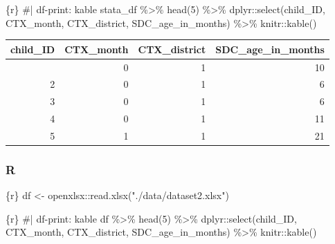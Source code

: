 \documentclass[
  letterpaper,
  DIV=11,
  numbers=noendperiod,
  oneside]{scrreprt}
\newenvironment{Shaded}{\begin{snugshade}}{\end{snugshade}}
\newcommand{\CommentTok}[1]{\textcolor[rgb]{0.37,0.37,0.37}{#1}}
\newcommand{\DecValTok}[1]{\textcolor[rgb]{0.68,0.00,0.00}{#1}}
\newcommand{\FunctionTok}[1]{\textcolor[rgb]{0.28,0.35,0.67}{#1}}
\newcommand{\InformationTok}[1]{\textcolor[rgb]{0.37,0.37,0.37}{#1}}
\newcommand{\NormalTok}[1]{\textcolor[rgb]{0.00,0.23,0.31}{#1}}
\newcommand{\OtherTok}[1]{\textcolor[rgb]{0.00,0.23,0.31}{#1}}
\newcommand{\SpecialCharTok}[1]{\textcolor[rgb]{0.37,0.37,0.37}{#1}}
\newcommand{\StringTok}[1]{\textcolor[rgb]{0.13,0.47,0.30}{#1}}
\begin{document}
\begin{Shaded}
\begin{Highlighting}[]
\InformationTok{\textasciigrave{}\textasciigrave{}\textasciigrave{}\{r\}}
\CommentTok{\#| df{-}print: kable}
\NormalTok{stata\_df }\SpecialCharTok{\%\textgreater{}\%}
  \FunctionTok{head}\NormalTok{(}\DecValTok{5}\NormalTok{) }\SpecialCharTok{\%\textgreater{}\%}
\NormalTok{  dplyr}\SpecialCharTok{::}\FunctionTok{select}\NormalTok{(child\_ID,}
\NormalTok{                CTX\_month,}
\NormalTok{                CTX\_district,}
\NormalTok{                SDC\_age\_in\_months) }\SpecialCharTok{\%\textgreater{}\%}
\NormalTok{  knitr}\SpecialCharTok{::}\FunctionTok{kable}\NormalTok{()}
\InformationTok{\textasciigrave{}\textasciigrave{}\textasciigrave{}}
\end{Highlighting}
\end{Shaded}

\begin{longtable}[]{@{}rrrr@{}}
\toprule\noalign{}
child\_ID & CTX\_month & CTX\_district & SDC\_age\_in\_months \\
\midrule\noalign{}
\endhead
\bottomrule\noalign{}
\endlastfoot
1 & 0 & 1 & 10 \\
2 & 0 & 1 & 6 \\
3 & 0 & 1 & 6 \\
4 & 0 & 1 & 11 \\
5 & 1 & 1 & 21 \\
\end{longtable}

\subsubsection{R}

\begin{Shaded}
\begin{Highlighting}[]
\InformationTok{\textasciigrave{}\textasciigrave{}\textasciigrave{}\{r\}}
\NormalTok{df }\OtherTok{\textless{}{-}}\NormalTok{ openxlsx}\SpecialCharTok{::}\FunctionTok{read.xlsx}\NormalTok{(}\StringTok{"./data/dataset2.xlsx"}\NormalTok{)}
\InformationTok{\textasciigrave{}\textasciigrave{}\textasciigrave{}}
\end{Highlighting}
\end{Shaded}

\begin{Shaded}
\begin{Highlighting}[]
\InformationTok{\textasciigrave{}\textasciigrave{}\textasciigrave{}\{r\}}
\CommentTok{\#| df{-}print: kable}
\NormalTok{df }\SpecialCharTok{\%\textgreater{}\%}
  \FunctionTok{head}\NormalTok{(}\DecValTok{5}\NormalTok{) }\SpecialCharTok{\%\textgreater{}\%}
\NormalTok{  dplyr}\SpecialCharTok{::}\FunctionTok{select}\NormalTok{(child\_ID,}
\NormalTok{                CTX\_month,}
\NormalTok{                CTX\_district,}
\NormalTok{                SDC\_age\_in\_months) }\SpecialCharTok{\%\textgreater{}\%}
\NormalTok{  knitr}\SpecialCharTok{::}\FunctionTok{kable}\NormalTok{()}
\InformationTok{\textasciigrave{}\textasciigrave{}\textasciigrave{}}
\end{Highlighting}
\end{Shaded}
\end{document}
